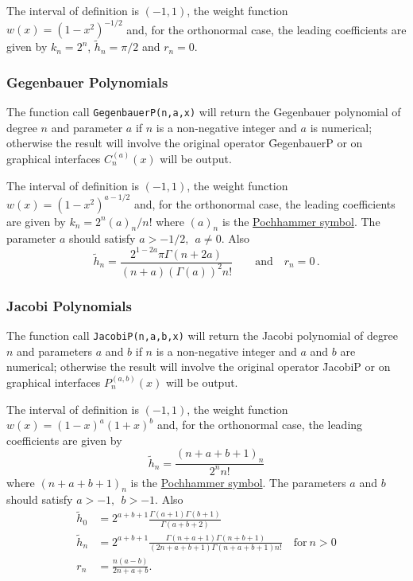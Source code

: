 The interval of definition is $(-1, 1)$, the weight function
$w(x)=(1-x^2)^{-1/2}$ and, for the orthonormal case, the leading
coefficients are given by $k_n= 2^n$, $\tilde{h}_n = \pi/2$ and $r_n=0$.

\subsubsection{Gegenbauer Polynomials}
\hypertarget{operator:GEGENBAUERP}{}
 
The function call \texttt{GegenbauerP(n,a,x)} will return the Gegenbauer
polynomial of degree $n$ and parameter $a$ if $n$ is a non-negative integer
and $a$ is numerical; otherwise the result will involve the original operator
\f{GegenbauerP} or on graphical interfaces $C_n^{(a)}(x)$ will be output.

The interval of definition is $(-1, 1)$, the weight function
$w(x)=(1-x^2)^{a-1/2}$ and, for the orthonormal case, the leading
coefficients are given by $k_n= 2^n (a)_n/n!$ where $(a)_n$ is the
\hyperlink{POCH}{Pochhammer symbol}.
The parameter $a$ should satisfy $a >-1/2,\ \ a \neq 0$. Also
\[\tilde{h}_n = \frac{2^{1-2 a}\pi \Gamma(n+2a)}{(n+a)(\Gamma(a))^2n!}\qquad
\mbox{and}\quad r_n=0\,.\]

\subsubsection{Jacobi Polynomials}
\hypertarget{operator:JACOBIP}{}
 
The function call \texttt{JacobiP(n,a,b,x)} will return the Jacobi
polynomial of degree $n$ and parameters $a$ and $b$ if $n$ is a non-negative
integer  and $a$ and $b$ are numerical; otherwise the result will involve
the original operator \f{JacobiP} or on graphical interfaces
$P_n^{(a, b)}(x)$ will be output.

The interval of definition is $(-1, 1)$, the weight function
$w(x)=(1-x)^a(1+x)^b$ and, for the orthonormal case, the leading
coefficients are given by
\[\tilde{h}_n = \frac{(n+a+b+1)_n}{2^nn!}\]
where $(n+a+b+1)_n$ is the \hyperlink{POCH}{Pochhammer symbol}.
The parameters $a$ and $b$ should satisfy $a >-1,\ \ b > -1$. Also
\begin{align*}
\tilde{h}_0 & = 2^{a+b+1}\frac{\Gamma(a+1)\Gamma(b+1)}{\Gamma(a+b+2)}\\
\tilde{h}_n & = 2^{a+b+1}\frac{\Gamma(n+a+1)\Gamma(n+b+1)}{(2 n +a+b+1)
\Gamma(n+a+b+1)n!}\quad \mbox{for}\ n>0\\
r_n & = \frac{n(a-b)}{2n+a+b}.
\end{align*}

